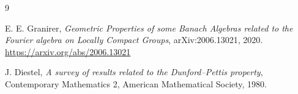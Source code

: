 \documentclass[11pt]{amsart}
\theoremstyle{remark}
\begin{document}
\begin{thebibliography}{9}

E. E. Granirer,
\emph{Geometric Properties of some Banach Algebras related to the Fourier
algebra on Locally Compact Groups},
arXiv:2006.13021, 2020.
\url{https://arxiv.org/abs/2006.13021}

J. Diestel,
\emph{A survey of results related to the Dunford--Pettis property},
Contemporary Mathematics 2, American Mathematical Society, 1980.

\end{thebibliography}
\end{document}
